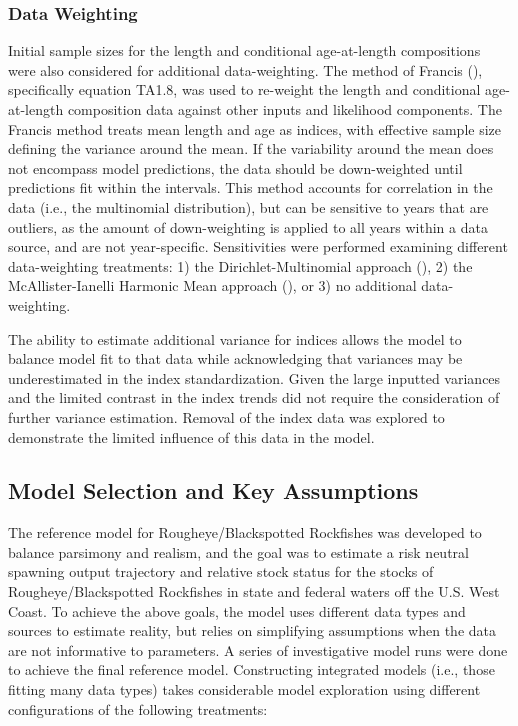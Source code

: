 \documentclass[
]{scrartcl}
\begin{document}
\subsubsection{Data Weighting}\label{data-weighting}

Initial sample sizes for the length and conditional age-at-length
compositions were also considered for additional data-weighting. The
method of Francis (), specifically
equation TA1.8, was used to re-weight the length and conditional
age-at-length composition data against other inputs and likelihood
components. The Francis method treats mean length and age as indices,
with effective sample size defining the variance around the mean. If the
variability around the mean does not encompass model predictions, the
data should be down-weighted until predictions fit within the intervals.
This method accounts for correlation in the data (i.e., the multinomial
distribution), but can be sensitive to years that are outliers, as the
amount of down-weighting is applied to all years within a data source,
and are not year-specific. Sensitivities were performed examining
different data-weighting treatments: 1) the Dirichlet-Multinomial
approach (), 2) the McAllister-Ianelli Harmonic Mean approach
(),
or 3) no additional data-weighting.

The ability to estimate additional variance for indices allows the model
to balance model fit to that data while acknowledging that variances may
be underestimated in the index standardization. Given the large inputted
variances and the limited contrast in the index trends did not require
the consideration of further variance estimation. Removal of the index
data was explored to demonstrate the limited influence of this data in
the model.

\subsection{Model Selection and Key
Assumptions}\label{model-selection-and-key-assumptions}

The reference model for Rougheye/Blackspotted Rockfishes was developed
to balance parsimony and realism, and the goal was to estimate a risk
neutral spawning output trajectory and relative stock status for the
stocks of Rougheye/Blackspotted Rockfishes in state and federal waters
off the U.S. West Coast. To achieve the above goals, the model uses
different data types and sources to estimate reality, but relies on
simplifying assumptions when the data are not informative to parameters.
A series of investigative model runs were done to achieve the final
reference model. Constructing integrated models (i.e., those fitting
many data types) takes considerable model exploration using different
configurations of the following treatments:
\end{document}
